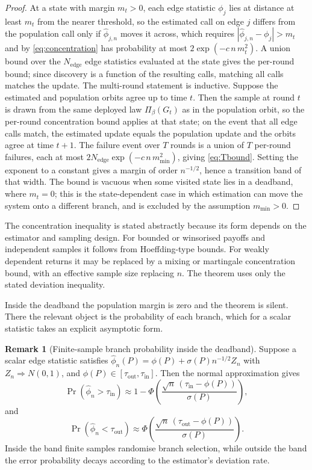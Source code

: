 \documentclass[11pt]{article}
\theoremstyle{plain}
\theoremstyle{definition}
\newtheorem{remark}{Remark}
\newcommand{\Pidep}{\Pi_\beta}
\begin{document}
\begin{proof}
At a state with margin $m_t>0$, each edge statistic $\phi_j$ lies at distance at least $m_t$ from the nearer threshold, so the estimated call on edge $j$ differs from the population call only if $\hat\phi_{j,n}$ moves it across, which requires $|\hat\phi_{j,n}-\phi_j|>m_t$ and by \eqref{eq:concentration} has probability at most $2\exp(-c\,n\,m_t^2)$. A union bound over the $N_{\mathrm{edge}}$ edge statistics evaluated at the state gives the per-round bound; since discovery is a function of the resulting calls, matching all calls matches the update. The multi-round statement is inductive. Suppose the estimated and population orbits agree up to time $t$. Then the sample at round $t$ is drawn from the same deployed law $\Pidep(G_t)$ as in the population orbit, so the per-round concentration bound applies at that state; on the event that all edge calls match, the estimated update equals the population update and the orbits agree at time $t+1$. The failure event over $T$ rounds is a union of $T$ per-round failures, each at most $2N_{\mathrm{edge}}\exp(-c\,n\,m_{\min}^2)$, giving \eqref{eq:Tbound}. Setting the exponent to a constant gives a margin of order $n^{-1/2}$, hence a transition band of that width. The bound is vacuous when some visited state lies in a deadband, where $m_t=0$; this is the state-dependent case in which estimation can move the system onto a different branch, and is excluded by the assumption $m_{\min}>0$.
\end{proof}

The concentration inequality is stated abstractly because its form depends on the estimator and sampling design. For bounded or winsorised payoffs and independent samples it follows from Hoeffding-type bounds. For weakly dependent returns it may be replaced by a mixing or martingale concentration bound, with an effective sample size replacing $n$. The theorem uses only the stated deviation inequality.

Inside the deadband the population margin is zero and the theorem is silent. There the relevant object is the probability of each branch, which for a scalar statistic takes an explicit asymptotic form.

\begin{remark}[Finite-sample branch probability inside the deadband]\label{prop:branch}
Suppose a scalar edge statistic satisfies $\hat\phi_n(P)=\phi(P)+\sigma(P)n^{-1/2}Z_n$ with $Z_n\Rightarrow N(0,1)$, and $\phi(P)\in[\tau_{\mathrm{out}},\tau_{\mathrm{in}}]$. Then the normal approximation gives
\[
\Pr(\hat\phi_n>\tau_{\mathrm{in}})\approx 1-\Phi\!\left(\frac{\sqrt n\,(\tau_{\mathrm{in}}-\phi(P))}{\sigma(P)}\right),
\]
and
\[
\Pr(\hat\phi_n<\tau_{\mathrm{out}})\approx \Phi\!\left(\frac{\sqrt n\,(\tau_{\mathrm{out}}-\phi(P))}{\sigma(P)}\right).
\]
Inside the band finite samples randomise branch selection, while outside the band the error probability decays according to the estimator's deviation rate.
\end{remark}
\end{document}
